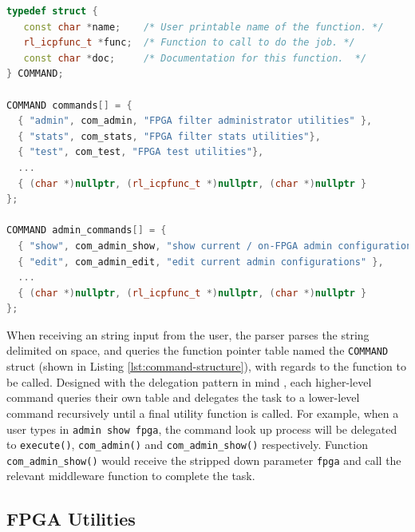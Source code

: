 \documentclass[a4paper]{report}
\newcommand{\code}{\texttt}
\begin{document}
\begin{lstlisting}[language=C++, caption=\code{COMMAND} structure,  label={lst:command-structure}]
typedef struct {
   const char *name;    /* User printable name of the function. */
   rl_icpfunc_t *func;  /* Function to call to do the job. */
   const char *doc;     /* Documentation for this function.  */
} COMMAND;

COMMAND commands[] = {
  { "admin", com_admin, "FPGA filter administrator utilities" },
  { "stats", com_stats, "FPGA filter stats utilities"},
  { "test", com_test, "FPGA test utilities"},
  ...
  { (char *)nullptr, (rl_icpfunc_t *)nullptr, (char *)nullptr }
};

COMMAND admin_commands[] = {
  { "show", com_admin_show, "show current / on-FPGA admin configurations [fpga/curr]" },
  { "edit", com_admin_edit, "edit current admin configurations" },
  ...
  { (char *)nullptr, (rl_icpfunc_t *)nullptr, (char *)nullptr }
};
\end{lstlisting}

When receiving an string input from the user, the parser parses the string delimited on space, and queries the function pointer table named the \code{COMMAND} struct (shown in Listing \ref{lst:command-structure}), with regards to the function to be called. Designed with the delegation pattern in mind \cite{gamma-1995}, each higher-level command queries their own table and delegates the task to a lower-level command recursively  until a final utility function is called. For example, when a user types in \code{admin show fpga}, the command look up process will be delegated to \code{execute()}, \code{com\_admin()} and \code{com\_admin\_show()} respectively. Function \code{com\_admin\_show()} would receive the stripped down parameter \code{fpga} and call the relevant middleware function to complete the task. 

\subsection{FPGA Utilities}
\end{document}
